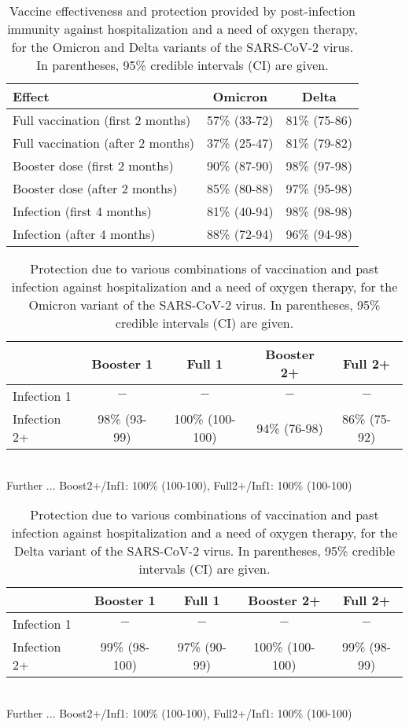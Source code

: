 \documentclass[preprint,12pt,authoryear]{elsarticle}
\begin{document}
\begin{table}[!h]
\caption{Vaccine effectiveness and protection provided by post-infection immunity against hospitalization and a need of oxygen therapy, for the Omicron and Delta variants of the SARS-CoV-2 virus. In parentheses, 95\% credible intervals (CI) are given. \\[1ex]}
\label{tabOalone}
\centering
\begin{tabular}{lcc}
\hline
Effect & Omicron & Delta \\
\hline
Full vaccination (first 2 months) & 57\% (33-72) & 81\% (75-86) \\
Full vaccination (after 2 months) & 37\% (25-47) & 81\% (79-82) \\
Booster dose (first 2 months) & 90\% (87-90) & 98\% (97-98) \\
Booster dose (after 2 months) & 85\% (80-88) & 97\% (95-98) \\
Infection (first 4 months) & 81\% (40-94) & 98\% (98-98) \\
Infection (after 4 months) & 88\% (72-94) & 96\% (94-98) \\
\hline
\end{tabular}
\end{table}

\begin{table}[!h]
\caption{Protection due to various combinations of vaccination and past infection  against hospitalization and a need of oxygen therapy, for the Omicron variant of the SARS-CoV-2 virus. In parentheses, 95\% credible intervals (CI) are given. \\[1ex]}
\label{tabOOinteractions}
\centering
\begin{tabular}{lcccc}
\hline
 & Booster 1 & Full 1 & Booster 2+ & Full 2+ \\
\hline
Infection 1 & $-$ & $-$ & $-$ & $-$ \\
Infection 2+ & 98\% (93-99) & 100\% (100-100) & 94\% (76-98) & 86\% (75-92) \\
\hline
\end{tabular} \\[1ex]
Further ... Boost2+/Inf1: 100\% (100-100), Full2+/Inf1: 100\% (100-100)
\end{table}

\begin{table}[!h]
\caption{Protection due to various combinations of vaccination and past infection  against hospitalization and a need of oxygen therapy, for the Delta variant of the SARS-CoV-2 virus. In parentheses, 95\% credible intervals (CI) are given. \\[1ex]}
\label{tabODinteractions}
\centering
\begin{tabular}{lcccc}
\hline
 & Booster 1 & Full 1 & Booster 2+ & Full 2+ \\
\hline
Infection 1 & $-$ & $-$ & $-$ & $-$ \\
Infection 2+ & 99\% (98-100) & 97\% (90-99) & 100\% (100-100) & 99\% (98-99) \\
\hline
\end{tabular} \\[1ex]
Further ... Boost2+/Inf1: 100\% (100-100), Full2+/Inf1: 100\% (100-100)
\end{table}
\end{document}
